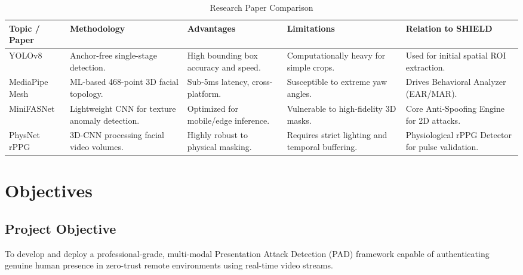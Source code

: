 \documentclass[12pt, a4paper]{report}
\begin{document}
\begin{table}[H]
\centering
\caption{Research Paper Comparison}
\begin{tabularx}{\textwidth}{|X|X|X|X|X|}
\hline
\textbf{Topic / Paper} & \textbf{Methodology} & \textbf{Advantages} & \textbf{Limitations} & \textbf{Relation to SHIELD} \\
\hline
YOLOv8 \cite{jocher2023yolo} & Anchor-free single-stage detection. & High bounding box accuracy and speed. & Computationally heavy for simple crops. & Used for initial spatial ROI extraction. \\
\hline
MediaPipe Mesh \cite{lugaresi2019mediapipe} & ML-based 468-point 3D facial topology. & Sub-5ms latency, cross-platform. & Susceptible to extreme yaw angles. & Drives Behavioral Analyzer (EAR/MAR). \\
\hline
MiniFASNet & Lightweight CNN for texture anomaly detection. & Optimized for mobile/edge inference. & Vulnerable to high-fidelity 3D masks. & Core Anti-Spoofing Engine for 2D attacks. \\
\hline
PhysNet rPPG \cite{yu2019remote} & 3D-CNN processing facial video volumes. & Highly robust to physical masking. & Requires strict lighting and temporal buffering. & Physiological rPPG Detector for pulse validation. \\
\hline
\end{tabularx}
\end{table}

\chapter{Objectives}

\section{Project Objective}
To develop and deploy a professional-grade, multi-modal Presentation Attack Detection (PAD) framework capable of authenticating genuine human presence in zero-trust remote environments using real-time video streams.
\end{document}
